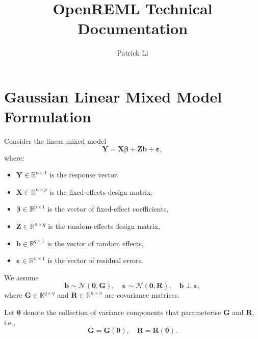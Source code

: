 \documentclass[
  letterpaper,
  DIV=11,
  numbers=noendperiod]{scrartcl}
\title{OpenREML Technical Documentation}
\author{Patrick Li}
\date{}
\providecommand{\tightlist}{%
  \setlength{\itemsep}{0pt}\setlength{\parskip}{0pt}}\usepackage{longtable,booktabs,array}
\renewcommand*\contentsname{Table of contents}
\newcommand\contentsname{Table of contents}
\begin{document}
\maketitle

\renewcommand*\contentsname{Table of contents}
{
\hypersetup{linkcolor=}
\setcounter{tocdepth}{3}
\tableofcontents
}

\section{Gaussian Linear Mixed Model
Formulation}\label{gaussian-linear-mixed-model-formulation}

Consider the linear mixed model \begin{equation}
\label{eq-main}
\symbf{Y} = \symbf{X}\symbf{\beta} + \symbf{Z}\symbf{b} + \symbf{\varepsilon},
\end{equation} where:

\begin{itemize}
\tightlist
\item
  \(\symbf{Y} \in \mathbb{R}^{n \times 1}\) is the response vector,
\item
  \(\symbf{X} \in \mathbb{R}^{n \times p}\) is the fixed-effects design
  matrix,
\item
  \(\symbf{\beta} \in \mathbb{R}^{p \times 1}\) is the vector of
  fixed-effect coefficients,
\item
  \(\symbf{Z} \in \mathbb{R}^{n \times q}\) is the random-effects design
  matrix,
\item
  \(\symbf{b} \in \mathbb{R}^{q \times 1}\) is the vector of random
  effects,
\item
  \(\symbf{\varepsilon} \in \mathbb{R}^{n \times 1}\) is the vector of
  residual errors.
\end{itemize}

We assume \begin{equation}
\symbf{b} \sim \mathcal{N}(\symbf{0}, \symbf{G}), \quad
\symbf{\varepsilon} \sim \mathcal{N}(\symbf{0}, \symbf{R}), \quad
\symbf{b} \perp \symbf{\varepsilon},
\end{equation} where \(\symbf{G} \in \mathbb{R}^{q \times q}\) and
\(\symbf{R} \in \mathbb{R}^{n \times n}\) are covariance matrices.

Let \(\symbf{\theta}\) denote the collection of variance components that
parameterise \(\symbf{G}\) and \(\symbf{R}\), i.e., \begin{equation}
\symbf{G} = \symbf{G}(\symbf{\theta}), \quad
\symbf{R} = \symbf{R}(\symbf{\theta}).
\end{equation}
\end{document}
